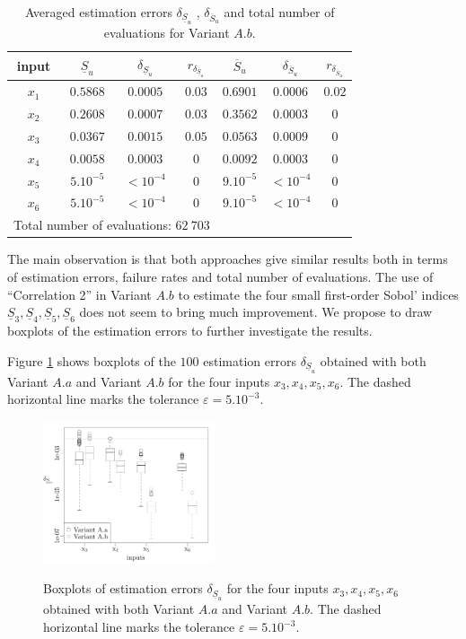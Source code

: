 \begin{table}[!ht]
\caption{Averaged estimation errors $\delta_{\underline{S}_u}$ , $\delta_{\overline{S}_u}$ and total number of evaluations for Variant $A.b$.}
\centering
\begin{tabular}{ccccccc}
\hline
 input & $\underline{S}_u$ & $\delta_{\underline{S}_u}$ & $r_{\delta_{\underline{S}_u}}$ & $\overline{S}_u$ & $\delta_{\overline{S}_u}$ &$r_{\delta_{\overline{S}_u}}$ \\ \hline
 $x_1$ & $0.5868$ &  $0.0005$ & $0.03$ & $0.6901$ & $0.0006$ & $0.02$ \\ \hline
 $x_2$ & $0.2608$ &  $0.0007$ & $0.03$ & $0.3562$ & $0.0003$ & $0$ \\ \hline
 $x_3$ & $0.0367$ &  $0.0015$ & $0.05$ & $0.0563$ & $0.0009$ & $0$ \\ \hline
 $x_4$ & $0.0058$ &  $0.0003$ & $0$ & $0.0092$ & $0.0003$ & $0$ \\ \hline
 $x_5$ & $5.10^{-5}$ & $< 10^{-4}$ & $0$ & $9.10^{-5}$ & $< 10^{-4}$ & $0$ \\ \hline
 $x_6$ & $5.10^{-5}$ & $< 10^{-4}$ & $0$  & $9.10^{-5}$ & $< 10^{-4}$ & $0$ \\ \hline \hline
\multicolumn{4}{l}{Total number of evaluations: $62 \ 703$} & & &\\ \hline 
\end{tabular}
\label{res.gfunc.Ab}
\end{table}

The main observation is that both approaches give similar results both in terms of estimation errors, failure rates and total number of evaluations. The use of ``Correlation 2'' in Variant $A.b$ to estimate the four small first-order Sobol' indices $\underline{S}_3, \underline{S}_4, \underline{S}_5, \underline{S}_6$ does not seem to bring much improvement. We propose to draw boxplots of the estimation errors to further investigate the results. 

Figure \ref{boxplots.gfunc} shows boxplots of the $100$ estimation errors $\delta_{\underline{S}_u}$ obtained with both Variant $A.a$ and Variant $A.b$ for the four inputs $x_3,x_4,x_5,x_6$. The dashed horizontal line marks the tolerance $\varepsilon=5.10^{-3}$.
\begin{figure}[!ht]
\caption{Boxplots of estimation errors $\delta_{\underline{S}_u}$ for the four inputs $x_3,x_4,x_5,x_6$ obtained with both Variant $A.a$ and Variant $A.b$. The dashed horizontal line marks the tolerance $\varepsilon=5.10^{-3}$.}
\centering
\includegraphics[width=0.45\textwidth]{Fig2.pdf}
\label{boxplots.gfunc}
\end{figure}

